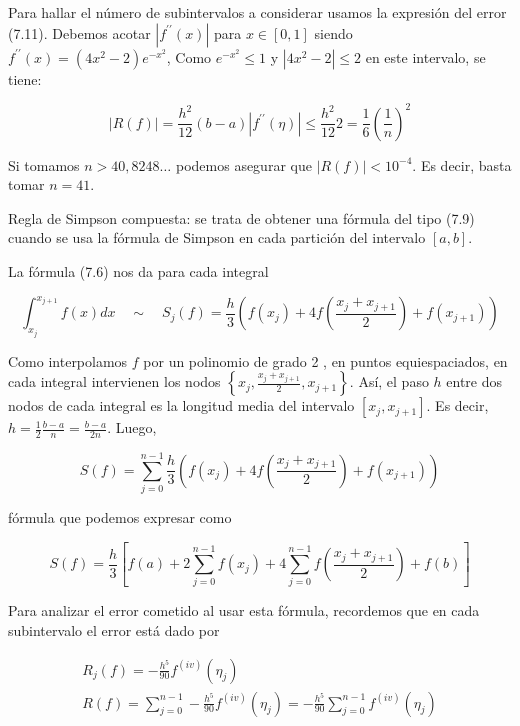\documentclass[10pt]{book}
\begin{document}
Para hallar el número de subintervalos a considerar usamos la expresión del error (7.11). Debemos acotar $\left|f^{\prime \prime}(x)\right|$ para $x \in[0,1]$ siendo $f^{\prime \prime}(x)=\left(4 x^{2}-2\right) e^{-x^{2}}$, Como $e^{-x^{2}} \leq 1$ y $\left|4 x^{2}-2\right| \leq 2$ en este intervalo, se tiene:

$$
|R(f)|=\frac{h^{2}}{12}(b-a)\left|f^{\prime \prime}(\eta)\right| \leq \frac{h^{2}}{12} 2=\frac{1}{6}\left(\frac{1}{n}\right)^{2}
$$

Si tomamos $n>40,8248 \ldots$ podemos asegurar que $|R(f)|<10^{-4}$. Es decir, basta tomar $n=41$.

Regla de Simpson compuesta: se trata de obtener una fórmula del tipo (7.9) cuando se usa la fórmula de Simpson en cada partición del intervalo $[a, b]$.

La fórmula (7.6) nos da para cada integral

$$
\int_{x_{j}}^{x_{j+1}} f(x) d x \quad \sim \quad S_{j}(f)=\frac{h}{3}\left(f\left(x_{j}\right)+4 f\left(\frac{x_{j}+x_{j+1}}{2}\right)+f\left(x_{j+1}\right)\right)
$$

Como interpolamos $f$ por un polinomio de grado 2 , en puntos equiespaciados, en cada integral intervienen los nodos $\left\{x_{j}, \frac{x_{j}+x_{j+1}}{2}, x_{j+1}\right\}$. Así, el paso $h$ entre dos nodos de cada integral es la longitud media del intervalo $\left[x_{j}, x_{j+1}\right]$. Es decir, $h=\frac{1}{2} \frac{b-a}{n}=\frac{b-a}{2 n}$. Luego,

$$
S(f)=\sum_{j=0}^{n-1} \frac{h}{3}\left(f\left(x_{j}\right)+4 f\left(\frac{x_{j}+x_{j+1}}{2}\right)+f\left(x_{j+1}\right)\right)
$$

fórmula que podemos expresar como


\begin{equation*}
S(f)=\frac{h}{3}\left[f(a)+2 \sum_{j=0}^{n-1} f\left(x_{j}\right)+4 \sum_{j=0}^{n-1} f\left(\frac{x_{j}+x_{j+1}}{2}\right)+f(b)\right] \tag{7.12}
\end{equation*}


Para analizar el error cometido al usar esta fórmula, recordemos que en cada subintervalo el error está dado por

$$
\begin{gathered}
R_{j}(f)=-\frac{h^{5}}{90} f^{(i v)}\left(\eta_{j}\right) \\
R(f)=\sum_{j=0}^{n-1}-\frac{h^{5}}{90} f^{(i v)}\left(\eta_{j}\right)=-\frac{h^{5}}{90} \sum_{j=0}^{n-1} f^{(i v)}\left(\eta_{j}\right)
\end{gathered}
$$
\end{document}
